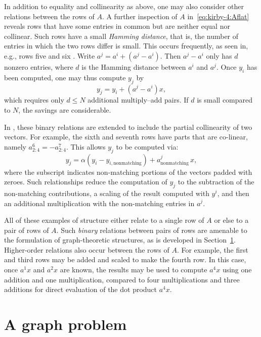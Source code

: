 In addition to equality and collinearity as above, one may also
consider other relations between the rows of $A$. A further inspection
of $A$ in~\eqref{eq:kirby-4:Aflat} reveals rows that have some entries
in common but are neither equal nor collinear. Such rows have a small
\emph{Hamming distance}, that is, the number of entries in which the
two rows differ is small. This occurs frequently, as seen in, e.g.,
rows five and six . Write $ a^j = a^i + (a^j-a^i) $. Then $ a^j -a^i $
only has $ d $ nonzero entries, where $d$ is the Hamming distance
between $a^i$ and $a^j$.  Once $ y_i $ has been computed, one may thus
compute $y_j$ by
\begin{equation}
y_j = y_i + \left( a^j - a^i \right) x,
\end{equation}
which requires only $ d \leq N $ additional multiply--add pairs. If
$ d $ is small compared to $ N $, the savings are considerable.

In \citet{WolfHeath2009}, these binary relations are extended to
include the partial collinearity of two vectors.  For example, the
sixth and seventh rows have parts that are co-linear, namely
$a^6_{2:4} = - a^7_{2:4}$.  This allows $y_j$ to be computed via:
\begin{equation}
  y_j = \alpha(y_i - y_{i,\mathrm{nonmatching}}) + a^j_{\mathrm{nonmatching}} \, x,
\end{equation}
where the subscript indicates non-matching portions of the vectors
padded with zeroes. Such relationships reduce the computation of $y_j$
to the subtraction of the non-matching contributions, a scaling of the
result computed with $y^i$, and then an additional multiplication with
the non-matching entries in $a^j$.

All of these examples of structure either relate to a single row of $
A $ or else to a pair of rows of $ A $. Such \emph{binary} relations
between pairs of rows are amenable to the formulation of
graph-theoretic structures, as is developed in
Section~\ref{sec:kirby-4:graph}. Higher-order relations also occur
between the rows of $ A $.  For example, the first and third rows may
be added and scaled to make the fourth row.  In this case, once $ a^1
x $ and $ a^2 x $ are known, the results may be used to compute $
a^{4} x $ using one addition and one multiplication, compared to four
multiplications and three additions for direct evaluation of the dot
product $a^{4} x$.

\section{A graph problem}
\label{sec:kirby-4:graph}


